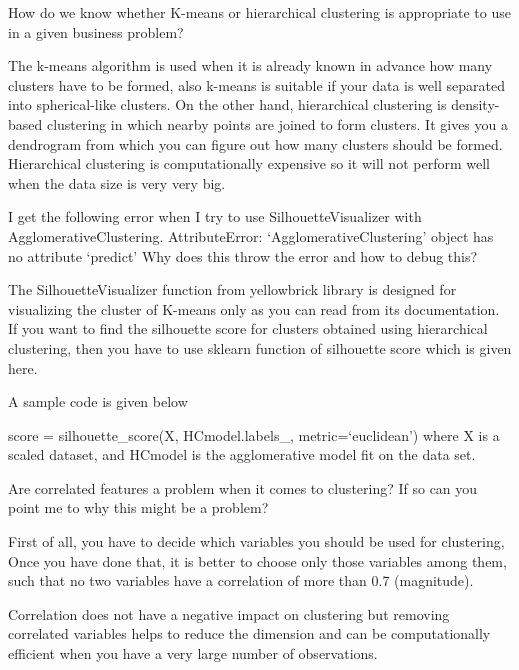 	\begin{qanda}
		\begin{question}
How do we know whether K-means or hierarchical clustering is appropriate to use in a given business problem?
		\end{question}
		\begin{answer}
The k-means algorithm is used when it is already known in advance how many clusters have to be formed, also k-means is suitable if your data is well separated into spherical-like clusters. On the other hand, hierarchical clustering is density-based clustering in which nearby points are joined to form clusters. It gives you a dendrogram from which you can figure out how many clusters should be formed. Hierarchical clustering is computationally expensive so it will not perform well when the data size is very very big.
		\end{answer}
	\end{qanda}

	\begin{qanda}
		\begin{question}
I get the following error when I try to use SilhouetteVisualizer with AgglomerativeClustering.
AttributeError: `AgglomerativeClustering' object has no attribute `predict'
Why does this throw the error and how to debug this?
		\end{question}
		\begin{answer}
The SilhouetteVisualizer function from yellowbrick library is designed for visualizing the cluster of K-means only as you can read from its documentation. If you want to find the silhouette score for clusters obtained using hierarchical clustering, then you have to use sklearn function of silhouette score which is given here.

A sample code is given below

score = silhouette\_score(X, HCmodel.labels\_, metric=`euclidean')
where X is a scaled dataset, and HCmodel is the agglomerative model fit on the data set.
		\end{answer}
	\end{qanda}

	\begin{qanda}
		\begin{question}
Are correlated features a problem when it comes to clustering? If so can you point me to why this might be a problem?
		\end{question}
		\begin{answer}
First of all, you have to decide which variables you should be used for clustering, Once you have done that, it is better to choose only those variables among them, such that no two variables have a correlation of more than 0.7 (magnitude).

Correlation does not have a negative impact on clustering but removing correlated variables helps to reduce the dimension and can be computationally efficient when you have a very large number of observations.
		\end{answer}
	\end{qanda}


